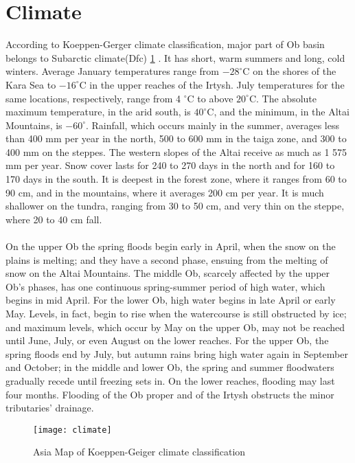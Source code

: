 \section{Climate}
According to Koeppen-Gerger climate classification, major part of Ob basin belongs to Subarctic climate(Dfc) \ref{fig:climate} \cite{peel2007updated}. It has short, warm summers and long, cold winters. Average January temperatures range from  $-28 ^{\circ}$C on the shores of the Kara Sea to $-16 ^{\circ}$C in the upper reaches of the Irtysh. July temperatures for the same locations, respectively, range from 4 $^{\circ}$C to above $20 ^{\circ}$C. The absolute maximum temperature, in the arid south, is $40 ^{\circ}$C,\cite{Obriver} and the minimum, in the Altai Mountains, is $-60 ^{\circ}$. Rainfall, which occurs mainly in the summer, averages less than 400 mm per year in the north, 500 to 600 mm in the taiga zone, and 300 to 400 mm on the steppes. The western slopes of the Altai receive as much as 1 575 mm per year. Snow cover lasts for 240 to 270 days in the north and for 160 to 170 days in the south. It is deepest in the forest zone, where it ranges from 60 to 90 cm, and in the mountains, where it averages 200 cm per year. It is much shallower on the tundra, ranging from 30 to 50 cm, and very thin on the steppe, where 20 to 40 cm fall.\cite{Obriver}\\\\
On the upper Ob the spring floods begin early in April, when the snow on the plains is melting; and they have a second phase, ensuing from the melting of snow on the Altai Mountains. The middle Ob, scarcely affected by the upper Ob's phases, has one continuous spring-summer period of high water, which begins in mid April. For the lower Ob, high water begins in late April or early May. Levels, in fact, begin to rise when the watercourse is still obstructed by ice; and maximum levels, which occur by May on the upper Ob, may not be reached until June, July, or even August on the lower reaches. For the upper Ob, the spring floods end by July, but autumn rains bring high water again in September and October; in the middle and lower Ob, the spring and summer floodwaters gradually recede until freezing sets in. On the lower reaches, flooding may last four months. Flooding of the Ob proper and of the Irtysh obstructs the minor tributaries' drainage.
\begin{figure}[htbp]
	\centering
	\texttt{[image: climate]} %
	\caption{Asia Map of Koeppen-Geiger climate classification \cite{peel2007updated}} 
	\label{fig:climate}
\end{figure}
